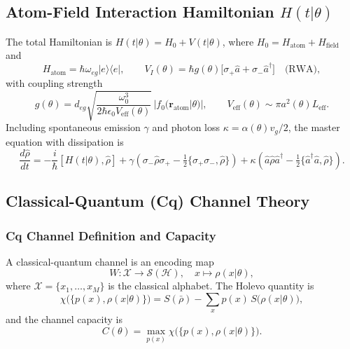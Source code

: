 \documentclass[12pt,a4paper]{article}
\theoremstyle{definition}
\theoremstyle{plain}
\begin{document}
\subsection{Atom-Field Interaction Hamiltonian $H(t|\theta)$}

The total Hamiltonian is $H(t|\theta)=H_0+V(t|\theta)$, where $H_0=H_{\mathrm{atom}}+H_{\mathrm{field}}$ and
\begin{equation}
H_{\mathrm{atom}}=\hbar\omega_{eg}|e\rangle\langle e|, \qquad
V_I(\theta)=\hbar g(\theta)\bigl[\sigma_+\hat{a}+\sigma_-\hat{a}^\dagger\bigr]
\quad\text{(RWA)},
\end{equation}
with coupling strength
\begin{equation}
g(\theta)=d_{eg}\sqrt{\frac{\omega_0^3}{2\hbar\epsilon_0 V_{\mathrm{eff}}(\theta)}}\,|f_0(\mathbf{r}_{\mathrm{atom}}|\theta)|, \qquad
V_{\mathrm{eff}}(\theta)\sim\pi a^2(\theta)L_{\mathrm{eff}}.
\label{eq:coupling_strength}
\end{equation}
Including spontaneous emission $\gamma$ and photon loss $\kappa=\alpha(\theta)v_g/2$, the
master equation with dissipation is
\begin{equation}
\frac{d\hat\rho}{dt}=-\frac{i}{\hbar}[H(t|\theta),\hat\rho]
+\gamma\!\left(\sigma_-\hat\rho\sigma_+-\tfrac{1}{2}\{\sigma_+\sigma_-,\hat\rho\}\right)
+\kappa\!\left(\hat{a}\hat\rho\hat{a}^\dagger-\tfrac{1}{2}\{\hat{a}^\dagger\hat{a},\hat\rho\}\right).
\end{equation}

\subsection{Classical-Quantum (Cq) Channel Theory}

\subsubsection{Cq Channel Definition and Capacity}

A classical-quantum channel is an encoding map
\begin{equation}
W:\mathcal{X}\to\mathcal{S}(\mathcal{H}),\quad x\mapsto\rho(x|\theta),
\end{equation}
where $\mathcal{X}=\{x_1,\dots,x_M\}$ is the classical alphabet. The Holevo quantity is
\begin{equation}
\chi\bigl(\{p(x),\rho(x|\theta)\}\bigr)=S(\bar\rho)-\sum_x p(x)\,S\bigl(\rho(x|\theta)\bigr),
\end{equation}
and the channel capacity is
\begin{equation}
C(\theta)=\max_{p(x)}\chi\bigl(\{p(x),\rho(x|\theta)\}\bigr).
\label{eq:holevo_capacity}
\end{equation}
\end{document}
